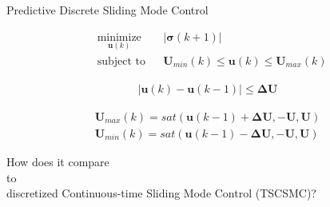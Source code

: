 \documentclass[12pt,svgnames,table,draft=false]{beamer}
\newcommand{\mbf}[1]{\mathbf{#1}}
\providecommand{\mbf}[1]{\mathbf{#1}}
\newcommand{\idxSample}{{\ensuremath{k}}}
\begin{document}
\begin{frame}{Predictive Discrete Sliding Mode Control}
\centering
\begin{tcolorbox}[colback=blue!5!white,colframe=blue!75!black,title=Adding hard magnitude and rate constraints \cite{Bolting2016}, width=.8\paperwidth]

\begin{align}
& \underset{\mbf{u}(\idxSample)}{\text{minimize}}
& & |\mbf{\sigma}(\idxSample+1)| \nonumber \\
& \text{subject to}
& & \mbf{U}_{min}(\idxSample) \leq \mbf{u}(\idxSample) \leq \mbf{U}_{max}(\idxSample) 
\nonumber
\end{align}

\begin{align}
|\mbf{u}(\idxSample) - \mbf{u}(\idxSample-1)| \leq \mbf{\Delta U} \nonumber
\end{align}

\begin{align}
\mbf{U}_{max}(\idxSample) = sat(\mbf{u}(\idxSample-1) + \mbf{\Delta U}, -\mbf{U}, \mbf{U}) \nonumber \\
\mbf{U}_{min}(\idxSample) = sat(\mbf{u}(\idxSample-1) - \mbf{\Delta U}, -\mbf{U}, \mbf{U}) \nonumber
\end{align}

\end{tcolorbox}
\end{frame}

\usebackgroundtemplate{}

\begin{frame}
\centering
\Large
\vspace{3em}
How does it compare \\to\\ discretized Continuous-time Sliding Mode Control (TSCSMC)?
\end{frame}
\end{document}
